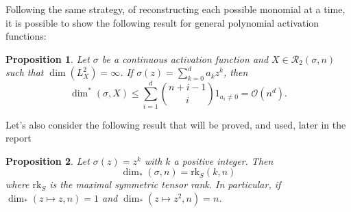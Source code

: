 \documentclass[11pt]{article} %
\newtheorem{proposition}{Proposition}[section]
\begin{document}
\par
Following the same strategy, of reconstructing each possible monomial at a time, it is possible to show the following result for general polynomial activation functions:
\begin{proposition} 
	Let $\sigma$ be a continuous activation function and $X\in \mathcal{R}_2(\sigma,n)$ such that $\dim(L^2_X) = \infty$. If $\sigma(z) = \sum_{k=0}^d a_k z^k$, then 
	\begin{equation*}
		\dim^*(\sigma, X) \leq \sum_{i=1}^d \binom{n+i-1}{i} 1_{a_i\neq 0} = \mathcal{O}(n^d).
	\end{equation*}
\end{proposition}
Let's also consider the following result that will be proved, and used, later in the report
\begin{proposition}
	Let $\sigma(z) = z^k$ with $k$ a positive integer. Then
	\begin{equation*}
		\dim_*(\sigma, n) = \text{rk}_S(k,n)
	\end{equation*}
	where $\text{rk}_S$ is the maximal symmetric tensor rank. In particular, if $\dim_*(z\mapsto z, n) = 1$ and $\dim_*(z\mapsto z^2, n) = n$.
\end{proposition}
\end{document}
